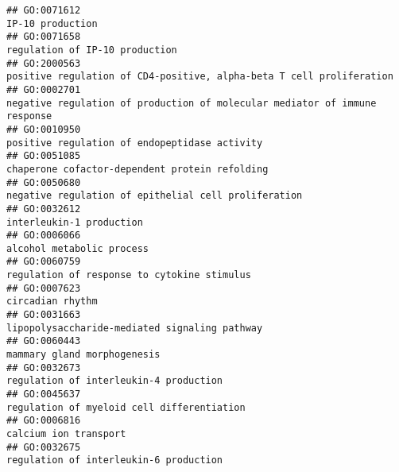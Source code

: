 \documentclass[
]{article}
\begin{document}
\begin{verbatim}
## GO:0071612                                                                                                                                 IP-10 production
## GO:0071658                                                                                                                   regulation of IP-10 production
## GO:2000563                                                                             positive regulation of CD4-positive, alpha-beta T cell proliferation
## GO:0002701                                                                       negative regulation of production of molecular mediator of immune response
## GO:0010950                                                                                                    positive regulation of endopeptidase activity
## GO:0051085                                                                                                   chaperone cofactor-dependent protein refolding
## GO:0050680                                                                                             negative regulation of epithelial cell proliferation
## GO:0032612                                                                                                                         interleukin-1 production
## GO:0006066                                                                                                                        alcohol metabolic process
## GO:0060759                                                                                                      regulation of response to cytokine stimulus
## GO:0007623                                                                                                                                 circadian rhythm
## GO:0031663                                                                                                    lipopolysaccharide-mediated signaling pathway
## GO:0060443                                                                                                                      mammary gland morphogenesis
## GO:0032673                                                                                                           regulation of interleukin-4 production
## GO:0045637                                                                                                       regulation of myeloid cell differentiation
## GO:0006816                                                                                                                            calcium ion transport
## GO:0032675                                                                                                           regulation of interleukin-6 production

\end{verbatim}
\end{document}
